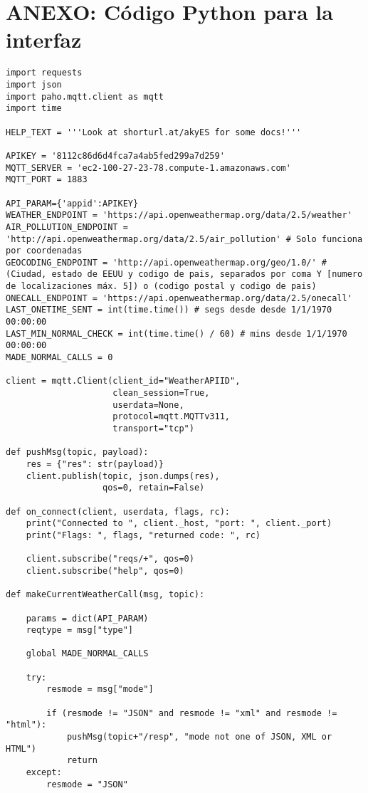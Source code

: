 \documentclass{scrbook}
\begin{document}
\chapter{ANEXO: Código Python para la interfaz}
\label{anexo:codigo_interfaz}
{\scriptsize
\begin{verbatim}
import requests
import json
import paho.mqtt.client as mqtt
import time

HELP_TEXT = '''Look at shorturl.at/akyES for some docs!'''

APIKEY = '8112c86d6d4fca7a4ab5fed299a7d259'
MQTT_SERVER = 'ec2-100-27-23-78.compute-1.amazonaws.com'
MQTT_PORT = 1883

API_PARAM={'appid':APIKEY}
WEATHER_ENDPOINT = 'https://api.openweathermap.org/data/2.5/weather'
AIR_POLLUTION_ENDPOINT = 'http://api.openweathermap.org/data/2.5/air_pollution' # Solo funciona por coordenadas
GEOCODING_ENDPOINT = 'http://api.openweathermap.org/geo/1.0/' # (Ciudad, estado de EEUU y codigo de pais, separados por coma Y [numero de localizaciones máx. 5]) o (codigo postal y codigo de pais)
ONECALL_ENDPOINT = 'https://api.openweathermap.org/data/2.5/onecall'
LAST_ONETIME_SENT = int(time.time()) # segs desde desde 1/1/1970 00:00:00
LAST_MIN_NORMAL_CHECK = int(time.time() / 60) # mins desde 1/1/1970 00:00:00
MADE_NORMAL_CALLS = 0

client = mqtt.Client(client_id="WeatherAPIID", 
                     clean_session=True,
                     userdata=None, 
                     protocol=mqtt.MQTTv311, 
                     transport="tcp")

def pushMsg(topic, payload):
    res = {"res": str(payload)}
    client.publish(topic, json.dumps(res),
                   qos=0, retain=False)

def on_connect(client, userdata, flags, rc):
    print("Connected to ", client._host, "port: ", client._port)
    print("Flags: ", flags, "returned code: ", rc)

    client.subscribe("reqs/+", qos=0)
    client.subscribe("help", qos=0)

def makeCurrentWeatherCall(msg, topic):

    params = dict(API_PARAM)
    reqtype = msg["type"]

    global MADE_NORMAL_CALLS

    try:
        resmode = msg["mode"]

        if (resmode != "JSON" and resmode != "xml" and resmode != "html"):
            pushMsg(topic+"/resp", "mode not one of JSON, XML or HTML")
            return
    except:
        resmode = "JSON"


\end{verbatim}}
\end{document}
